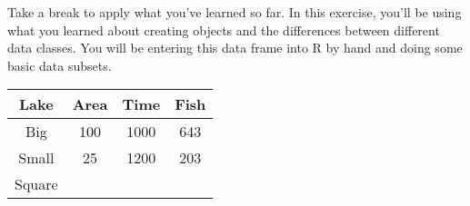 \documentclass[]{book}
\theoremstyle{definition}
\theoremstyle{definition}
\theoremstyle{definition}
\theoremstyle{remark}
\begin{document}
Take a break to apply what you've learned so far. In this exercise,
you'll be using what you learned about creating objects and the
differences between different data classes. You will be entering this
data frame into R by hand and doing some basic data subsets.

\begin{longtable}[]{@{}cccc@{}}
\toprule
\begin{minipage}[b]{0.11\columnwidth}\centering\strut
Lake\strut
\end{minipage} & \begin{minipage}[b]{0.09\columnwidth}\centering\strut
Area\strut
\end{minipage} & \begin{minipage}[b]{0.09\columnwidth}\centering\strut
Time\strut
\end{minipage} & \begin{minipage}[b]{0.09\columnwidth}\centering\strut
Fish\strut
\end{minipage}\tabularnewline
\midrule
\endhead
\begin{minipage}[t]{0.11\columnwidth}\centering\strut
Big\strut
\end{minipage} & \begin{minipage}[t]{0.09\columnwidth}\centering\strut
100\strut
\end{minipage} & \begin{minipage}[t]{0.09\columnwidth}\centering\strut
1000\strut
\end{minipage} & \begin{minipage}[t]{0.09\columnwidth}\centering\strut
643\strut
\end{minipage}\tabularnewline
\begin{minipage}[t]{0.11\columnwidth}\centering\strut
Small\strut
\end{minipage} & \begin{minipage}[t]{0.09\columnwidth}\centering\strut
25\strut
\end{minipage} & \begin{minipage}[t]{0.09\columnwidth}\centering\strut
1200\strut
\end{minipage} & \begin{minipage}[t]{0.09\columnwidth}\centering\strut
203\strut
\end{minipage}\tabularnewline
\begin{minipage}[t]{0.11\columnwidth}\centering\strut
Square\strut
\end{minipage} & \begin{minipage}[t]{0.09\columnwidth}\centering\strut

\end{minipage}
\end{longtable}
\end{document}

